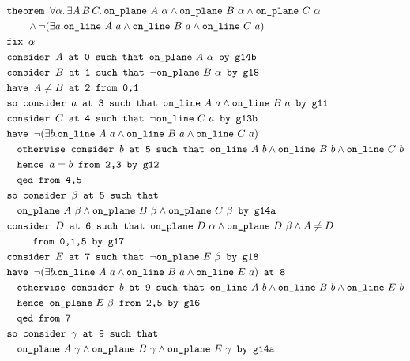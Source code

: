 \begin{figure}
\small
\begin{align*}
&\texttt{theorem }\forall\alpha.\,\exists A\,B\,C.\,\onplane{A}{\alpha} \wedge \onplane{B}{\alpha} \wedge  \onplane{C}{\alpha}\\
&\qquad\wedge  \Triangle{a}{A}{B}{C}\\
&\texttt{fix } \alpha\\
&\texttt{consider } A \texttt{ at 0 such that } \onplane{A}{\alpha} \texttt{ by g14b}\\
&\texttt{consider } B \texttt{ at 1 such that } \neg \onplane{B}{\alpha} \texttt{ by g18}\\
&\texttt{have } A \neq B \texttt{ at 2 from 0,1}\\
&\texttt{so consider } a \texttt{ at 3 such that } \online{A}{a} \wedge  \online{B}{a} \texttt{ by g11}\\
&\texttt{consider } C \texttt{ at 4 such that } \neg \online{C}{a} \texttt{ by g13b}\\
&\texttt{have } \Triangle{b}{A}{B}{C}\\
&\quad\texttt{otherwise consider } b \texttt{ at 5 such that }\online{A}{b}\wedge \online{B}{b}\wedge \online{C}{b}\\
&\quad\texttt{hence } a = b \texttt{ from 2,3 by g12}\\
&\quad\texttt{qed from 4,5}\\
&\texttt{so consider } \beta \texttt{ at 5 such that }\\
&\quad\onplane{A}{\beta}\wedge \onplane{B}{\beta}\wedge \onplane{C}{\beta} \texttt{ by g14a}\\
&\texttt{consider } D \texttt{ at 6 such that } \onplane{D}{\alpha}\wedge \onplane{D}{\beta}\wedge A\neq D \\
&\qquad\texttt{ from 0,1,5 by g17}\\
&\texttt{consider } E \texttt{ at 7 such that } \neg \onplane{E}{\beta} \texttt{ by g18}\\
&\texttt{have } \Triangle{b}{A}{B}{E} \texttt{ at 8}\\
&\quad\texttt{otherwise consider } b \texttt{ at 9 such that }\online{A}{b}\wedge \online{B}{b}\wedge  \online{E}{b}\\
&\quad\texttt{hence }\onplane{E}{\beta} \texttt{ from 2,5 by g16}\\
&\quad\texttt{qed from 7}\\
&\texttt{so consider } \gamma \texttt{ at 9 such that}\\
&\quad\onplane{A}{\gamma}\wedge \onplane{B}{\gamma}\wedge \onplane{E}{\gamma}\texttt{ by g14a}\\

\end{align*}
\end{figure}
